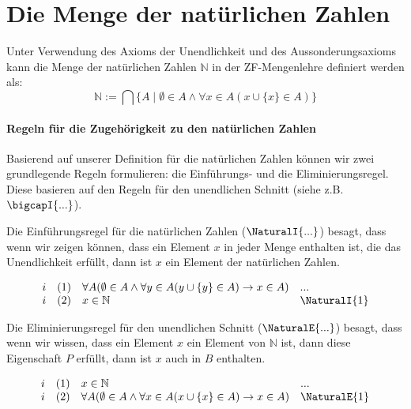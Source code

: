 \documentclass[main.tex]{subfiles}
\begin{document}
\chapter{Die Menge der natürlichen Zahlen}

\begin{definition}
	Unter Verwendung des Axioms der Unendlichkeit und des Aussonderungsaxioms kann die Menge der natürlichen Zahlen \( \mathbb{N} \) in der ZF-Mengenlehre definiert werden als:
	\[
	\mathbb{N} := \bigcap \{A\mid \emptyset \in A\land \forall x\in A(x\cup \{x\}\in A) \}
	\]
\end{definition}

\subsubsection{Regeln für die Zugehörigkeit zu den natürlichen Zahlen}
\label{rule:NaturalI} \label{rule:NaturalE}

Basierend auf unserer Definition für die natürlichen Zahlen können wir zwei grundlegende Regeln formulieren: die Einführungs- und die Eliminierungsregel. Diese basieren auf den Regeln für den unendlichen Schnitt (siehe z.B. $\bigcapI{...}$).

Die Einführungsregel für die natürlichen Zahlen (\( \NaturalI{...}\)) besagt, dass wenn wir zeigen können, dass ein Element \(x\) in jeder Menge enthalten ist, die das Unendlichkeit erfüllt, dann ist \(x\) ein Element der natürlichen Zahlen.

\[
\begin{array}{llll}
	i & (1) & \forall A(\emptyset\in A\land \forall y\in A(y\cup \{y\}\in A)\rightarrow x\in A) & ... \\
	i & (2) & x\in \mathbb{N} & \NaturalI{1} \\
\end{array}
\]

Die Eliminierungsregel für den unendlichen Schnitt (\( \NaturalE{...}\)) besagt, dass wenn wir wissen, dass ein Element \(x\) ein Element von $\mathbb{N}$ ist, dann diese Eigenschaft \(P\) erfüllt, dann ist \(x\) auch in \(B\) enthalten.

\[
\begin{array}{llll}
	i & (1) & x\in \mathbb{N} & ... \\
	i & (2) & \forall A(\emptyset\in A\land \forall x\in A(x\cup \{x\}\in A)\rightarrow x\in A) & \NaturalE{1} \\
\end{array}
\]
\end{document}

